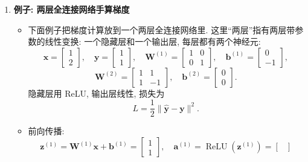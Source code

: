 \documentclass{../nndlcourse}
\begin{document}
\begin{enumerate}
    \item \textbf{例子: 两层全连接网络手算梯度}
    \begin{itemize}
        \item 下面例子把梯度计算放到一个两层全连接网络里. 这里“两层”指有两层带参数的线性变换: 一个隐藏层和一个输出层, 每层都有两个神经元:
        \[
            \boldsymbol{x}=
            \begin{bmatrix}
            1\\
            2
            \end{bmatrix},
            \quad
            \boldsymbol{y}=
            \begin{bmatrix}
            1\\
            1
            \end{bmatrix},
            \quad
            \boldsymbol{W}^{(1)}=
            \begin{bmatrix}
            1 & 0\\
            0 & 1
            \end{bmatrix},
            \quad
            \boldsymbol{b}^{(1)}=
            \begin{bmatrix}
            0\\
            -1
            \end{bmatrix},
        \]
        \[
            \boldsymbol{W}^{(2)}=
            \begin{bmatrix}
            1 & 1\\
            1 & -1
            \end{bmatrix},
            \quad
            \boldsymbol{b}^{(2)}=
            \begin{bmatrix}
            0\\
            0
            \end{bmatrix}.
        \]
        隐藏层用 ReLU, 输出层线性, 损失为
        \[
            L=\frac{1}{2}\|\hat{\boldsymbol{y}}-\boldsymbol{y}\|^2.
        \]
        \item 前向传播:
        \[
            \boldsymbol{z}^{(1)}
            =
            \boldsymbol{W}^{(1)}\boldsymbol{x}+\boldsymbol{b}^{(1)}
            =
            \begin{bmatrix}
            1\\
            1
            \end{bmatrix},
            \quad
            \boldsymbol{a}^{(1)}
            =
            \operatorname{ReLU}(\boldsymbol{z}^{(1)})
            =
            \begin{bmatrix}

\end{bmatrix}\]
\end{itemize}
\end{enumerate}
\end{document}
